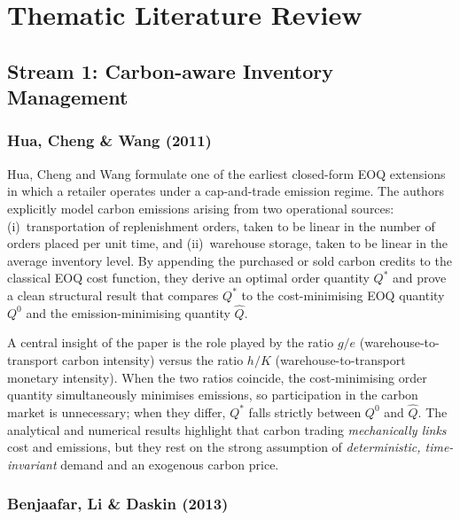 \documentclass[11pt,a4paper]{article}
\begin{document}
\section{Thematic Literature Review}

\subsection{Stream 1: Carbon-aware Inventory Management}

\subsubsection*{Hua, Cheng \& Wang (2011)}

Hua, Cheng and Wang formulate one of the earliest closed-form EOQ
extensions in which a retailer operates under a cap-and-trade emission
regime. The authors explicitly model carbon emissions arising from two
operational sources: (i)~transportation of replenishment orders, taken to
be linear in the number of orders placed per unit time, and (ii)~warehouse
storage, taken to be linear in the average inventory level. By appending the
purchased or sold carbon credits to the classical EOQ cost function, they
derive an optimal order quantity $Q^{*}$ and prove a clean structural
result that compares $Q^{*}$ to the cost-minimising EOQ quantity $Q^{0}$
and the emission-minimising quantity $\hat{Q}$.

A central insight of the paper is the role played by the ratio
$g/e$ (warehouse-to-transport carbon intensity) versus the ratio
$h/K$ (warehouse-to-transport monetary intensity). When the two ratios
coincide, the cost-minimising order quantity simultaneously minimises
emissions, so participation in the carbon market is unnecessary; when
they differ, $Q^{*}$ falls strictly between $Q^{0}$ and $\hat{Q}$. The
analytical and numerical results highlight that carbon trading
\emph{mechanically links} cost and emissions, but they rest on the strong
assumption of \emph{deterministic, time-invariant} demand and an
exogenous carbon price.

\subsubsection*{Benjaafar, Li \& Daskin (2013)}
\end{document}
